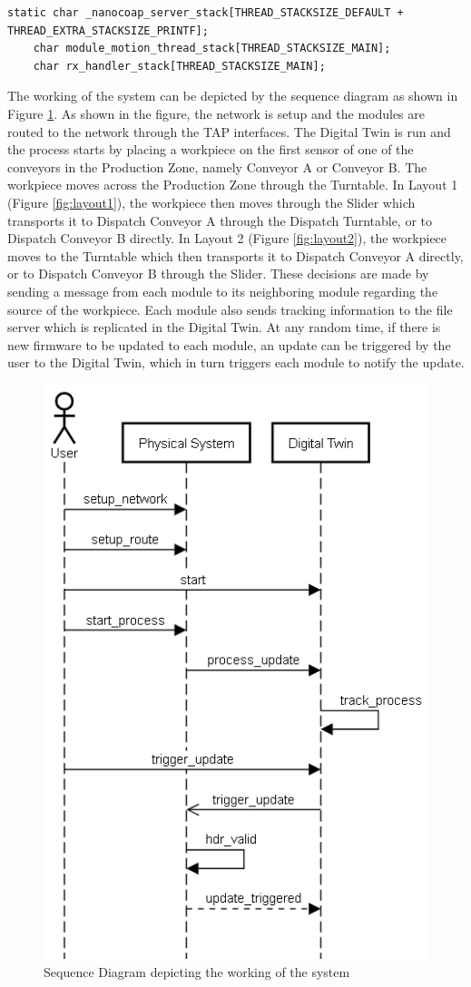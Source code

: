\begin{lstlisting}[caption=Memory Allocation for Threads]
    static char _nanocoap_server_stack[THREAD_STACKSIZE_DEFAULT + THREAD_EXTRA_STACKSIZE_PRINTF];
    char module_motion_thread_stack[THREAD_STACKSIZE_MAIN];
    char rx_handler_stack[THREAD_STACKSIZE_MAIN];
\end{lstlisting}

The working of the system can be depicted by the sequence diagram as shown in Figure \ref{fig:sequence}. As shown in the figure, the network is setup and the modules are routed to the network through the TAP interfaces. The Digital Twin is run and the process starts by placing a workpiece on the first sensor of one of the conveyors in the Production Zone, namely Conveyor A or Conveyor B. The workpiece moves across the Production Zone through the Turntable. In Layout 1 (Figure \ref{fig:layout1}), the workpiece then moves through the Slider which transports it to Dispatch Conveyor A through the Dispatch Turntable, or to Dispatch Conveyor B directly. In Layout 2 (Figure \ref{fig:layout2}), the workpiece moves to the Turntable which then transports it to Dispatch Conveyor A directly, or to Dispatch Conveyor B through the Slider. These decisions are made by sending a message from each module to its neighboring module regarding the source of the workpiece. Each module also sends tracking information to the file server which is replicated in the Digital Twin. At any random time, if there is new firmware to be updated to each module, an update can be triggered by the user to the Digital Twin, which in turn triggers each module to notify the update.

\begin{figure}
    \centering
    \includegraphics[scale=0.8]{images/Sequence.png}
    \caption{Sequence Diagram depicting the working of the system}
    \label{fig:sequence}
\end{figure}